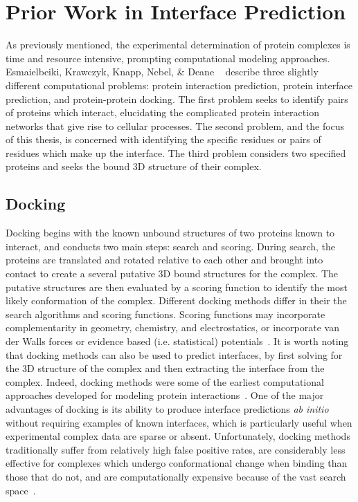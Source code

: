 \chapter{Prior Work in Interface Prediction}
\label{chap:relatedwork} 


As previously mentioned, the experimental determination of protein complexes is time and resource intensive, prompting computational modeling approaches.
Esmaielbeiki, Krawczyk, Knapp, Nebel, \& Deane ~\cite{esmaielbeiki2015} describe three slightly different computational problems: protein interaction prediction, protein interface prediction, and protein-protein docking.
The first problem seeks to identify pairs of proteins which interact, elucidating the complicated protein interaction networks that give rise to cellular processes. 
The second problem, and the focus of this thesis, is concerned with identifying the specific residues or pairs of residues which make up the interface.
The third problem considers two specified proteins and seeks the bound 3D structure of their complex.

\section{Docking}

Docking begins with the known unbound structures of two proteins known to interact, and conducts two main steps: search and scoring.
During search, the proteins are translated and rotated relative to each other and brought into contact to create a several putative 3D bound structures for the complex.
The putative structures are then evaluated by a scoring function to identify the most likely conformation of the complex.
Different docking methods differ in their the search algorithms and scoring functions.
Scoring functions may incorporate complementarity in geometry, chemistry, and electrostatics, or incorporate van der Walls forces or evidence based (i.e. statistical) potentials~\cite{tuncbag2011}\cite{janin1995}.
It is worth noting that docking methods can also be used to predict interfaces, by first solving for the 3D structure of the complex and then extracting the interface from the complex.
Indeed, docking methods were some of the earliest computational approaches developed for modeling protein interactions~\cite{janin1995}.
One of the major advantages of docking is its ability to produce interface predictions \emph{ab initio} without requiring examples of known interfaces, which is particularly useful when experimental complex data are sparse or absent.
Unfortunately, docking methods traditionally suffer from relatively high false positive rates, are considerably less effective for complexes which undergo conformational change when binding than those that do not, and are computationally expensive because of the vast search space~\cite{janin1995}\cite{tuncbag2011}.

